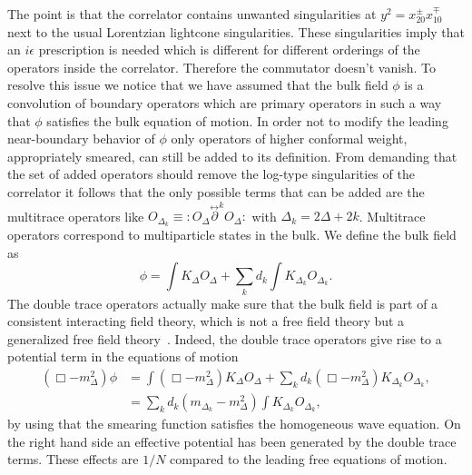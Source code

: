 \documentclass{PoS}
\newcommand{\LF}{\left(}
\newcommand{\RF}{\right)}
\begin{document}
The point is that the correlator contains unwanted singularities at $y^2 = x_{20}^{\pm}x_{10}^\mp$ next to the usual Lorentzian lightcone singularities. These singularities imply that an $i\epsilon$ prescription is needed which is different for different orderings of the operators inside the correlator. Therefore the commutator doesn't vanish. To resolve this issue we notice that we have assumed that the bulk field $\phi$ is a convolution of boundary operators which are primary operators in such a way that $\phi$ satisfies the bulk equation of motion. In order not to modify the leading near-boundary behavior of $\phi$ only operators of higher conformal weight, appropriately smeared, can still be added to its definition. From demanding that the set of added operators should remove the log-type singularities of the correlator it follows that the only possible terms that can be added are the multitrace operators like $O_{\Delta_k}\equiv  : O_\Delta \overset{\leftrightarrow}{\partial}^k O_\Delta:$ with $\Delta_k = 2\Delta +2k$. Multitrace operators correspond to multiparticle states in the bulk. We define the bulk field as
\begin{equation}
\phi = \int\limits K_\Delta O_\Delta + \sum\limits_k d_k \int K_{\Delta_k} O_{\Delta_k}.
\end{equation}
The double trace operators actually make sure that the bulk field is part of a consistent interacting field theory, which is not a free field theory but a generalized free field theory~\cite{Balasubramanian:1999ri,ElShowk:2011ag,Kabat:2013wga}. Indeed, the double trace operators give rise to a potential term in the equations of motion
\begin{align}
\LF \Box - m_\Delta^2\RF \phi &= \int (\Box-m_\Delta^2)K_\Delta O_\Delta + \sum\limits_{k} d_k (\Box - m_\Delta^2) K_{\Delta_k} O_{\Delta_k},\\
&= \sum\limits_k d_k (m_{\Delta_k}-m_\Delta^2)\int K_{\Delta_k}O_{\Delta_k},
\end{align}
by using that the smearing function satisfies the homogeneous wave equation. On the right hand side an effective potential has been generated by the double trace terms. These effects are $1/N$ compared to the leading free equations of motion.
\end{document}
